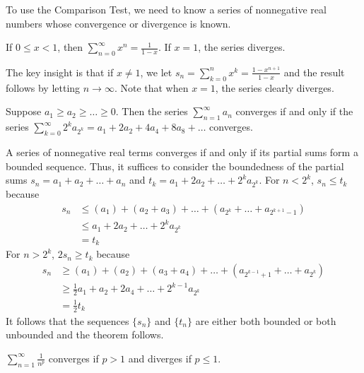 \documentclass{jacky}
\begin{document}
\begin{note}
  To use the Comparison Test, we need to know a series of nonnegative real
  numbers whose convergence or divergence is known.
\end{note}

\begin{prop}
  If $0\le x<1$, then $\sum_{n=0}^\infty x^n=\frac{1}{1-x}$. If $x=1$, the
  series diverges.
\end{prop}

\begin{pf}
  The key insight is that if $x\neq1$, we let
  $s_n=\sum_{k=0}^nx^k=\frac{1-x^{n+1}}{1-x}$ and the result follows by letting
  $n\to\infty$. Note that when $x=1$, the series clearly diverges.
\end{pf}

\begin{thm}
  Suppose $a_1\ge a_2\ge\ldots\ge0$. Then the series $\sum_{n=1}^\infty a_n$
  converges if and only if the series
  $\sum_{k=0}^\infty2^ka_{2^k}=a_1+2a_2+4a_4+8a_8+\ldots$ converges.
\end{thm}

\begin{pf}
  A series of nonnegative real terms converges if and only if its partial sums
  form a bounded sequence. Thus, it suffices to consider the boundedness of the
  partial sums $s_n=a_1+a_2+\ldots+a_n$ and $t_k=a_1+2a_2+\ldots+2^ka_{2^k}$.
  For $n<2^k$, $s_n\le t_k$ because
  \begin{align*}
    s_n&\le(a_1)+(a_2+a_3)+\ldots+(a_{2^k}+\ldots+a_{2^{k+1}-1})\\
       &\le a_1+2a_2+\ldots+2^ka_{2^k}\\
       &=t_k
  \end{align*}
  For $n>2^k$, $2s_n\ge t_k$ because
  \begin{align*}
    s_n&\ge(a_1)+(a_2)+(a_3+a_4)+\ldots+(a_{2^{k-1}+1}+\ldots+a_{2^k})\\
       &\ge\frac{1}{2}a_1+a_2+2a_4+\ldots+2^{k-1}a_{2^k}\\
       &=\frac{1}{2}t_k
  \end{align*}
  It follows that the sequences $\{s_n\}$ and $\{t_n\}$ are either both bounded
  or both unbounded and the theorem follows.
\end{pf}

\begin{prop}
  $\sum_{n=1}^\infty\frac{1}{n^p}$ converges if $p>1$ and diverges if $p\le1$.
\end{prop}
\end{document}

